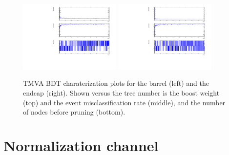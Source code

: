 \documentclass[10pt,a4paper]{article}
\begin{document}
\begin{figure}
  \centering
  \includegraphics[width=0.45\textwidth]{Figures/BDTControlPlots_barrel}
  \includegraphics[width=0.45\textwidth]{Figures/BDTControlPlots_endcaps}
  \caption{TMVA BDT charaterization plots for the barrel (left) and the endcap (right). Shown versus the tree number is the boost weight (top) and the event misclassification rate (middle), and the number of nodes before pruning (bottom).}
  \label{fig:BDTControlPlots}
\end{figure}




\clearpage


\clearpage
\section{Normalization channel}
\end{document}
